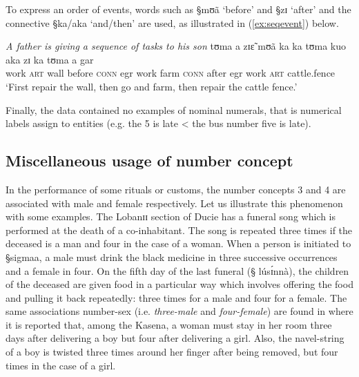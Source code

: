 To express an order of events, words such as {\S mʊã}  `before' and
{\S zɪ} `after' and the connective {\S ka/aka}  `and/then'
are used, as illustrated in (\ref{ex:seqevent}) below. 

\begin{exe}
\ex\label{ex:seqevent}{\it A father is giving a sequence of tasks to his son}
 \gll tʊma  a  zɪɛ̃  mʊã  ka  ka  tʊma  kuo   aka   zɪ ka  tʊma a  gar  \\
  {work} \textsc{art}    {wall} {before}  \textsc{conn} {\sc egr}    {work}
{farm} 
\textsc{conn} {after}  {\sc egr} {work} \textsc{art} {cattle.fence}\\  
\glt  `First repair the wall, then go and farm, then repair the cattle fence.'
\end{exe}


Finally, the data contained no examples of nominal numerals, that is numerical
labels assign to entities (e.g.
the 5 is late < the bus number five is late). 



% 



\subsection{Miscellaneous usage of number concept} 
\label{sec:NUM-misc-usage}

In the performance of some rituals or customs, the number concepts 3
and 4 are associated with male and female respectively. Let us illustrate this
phenomenon 
with some examples. The Lobanɪɪ section of Ducie has a funeral song which is 
performed at
the death of a co-inhabitant. The song is repeated three times if the deceased
is a man and four in the case of a woman. When a person is initiated
to {\S sigmaa}, a male must drink the black medicine in three successive
occurrences and a female in four.  On the fifth day of the last funeral ({\S
lúsɪ́nnà}), the children of the deceased are given food in a particular way
which involves offering the food and pulling  it back repeatedly: three times
for a male and four for a female. The same associations number-sex (i.e. {\it
three-male} and {\it
four-female})
are found in \citet[68-70]{Card27} where it is reported that, among the Kasena,
a woman must stay in her room three days after delivering a boy but four after
delivering a girl. Also,  the navel-string of a boy is twisted three times
 around her finger after being removed, but four times in the case of a
girl.

